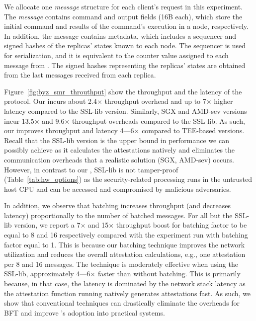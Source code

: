 We allocate one {\em message} structure for each client's request in this experiment. The {\em message} contains command and output fields (16B each), which store the initial command and results of the command's execution in a node, respectively. In addition, the message contains metadata, which includes a sequencer and signed hashes of the replicas' states known to each node. The sequencer is used for serialization, and it is equivalent to the counter value assigned to each message from \projecttitle{}. The signed hashes representing the replicas' states are obtained from the last messages received from each replica.

 Figure~\ref{fig:byz_smr_throuthput} show the throughput and the latency of the protocol. Our \projecttitle{} incurs about 2.4$\times$ throughput overhead and up to 7$\times$ higher latency compared to the SSL-lib version. Similarly, SGX and AMD-sev versions incur 13.5$\times$ and 9.6$\times$ throughput overheads compared to the SSL-lib. As such, our \projecttitle{} improves throughput and latency 4---6$\times$ compared to TEE-based versions. Recall that the SSL-lib version is the upper bound in performance we can possibly achieve as it calculates the attestations natively and eliminates the communication overheads that a realistic solution (SGX, AMD-sev) occurs. However, in contrast to our \projecttitle{}, SSL-lib is not tamper-proof (Table~\ref{tab:hw_options}) as the security-related processing runs in the untrusted host CPU and can be accessed and compromised by malicious adversaries.



In addition, we observe that batching increases throughput (and decreases latency) proportionally to the number of batched messages. For all but the SSL-lib version, we report a 7$\times$ and 15$\times$ throughput boost for batching factor to be equal to 8 and 16 respectively compared with the experiment run with batching factor equal to 1. This is because our batching technique improves the network utilization and reduces the overall attestation calculations, e.g., one attestation per 8 and 16 messages. The technique is moderately effective when using the SSL-lib, approximately 4---6$\times$ faster than without batching. This is primarily because, in that case, the latency is dominated by the network stack latency as the attestation function running natively generates attestations fast. As such, we show that conventional techniques can drastically eliminate the overheads for BFT and improve \projecttitle{}'s adoption into practical systems.


